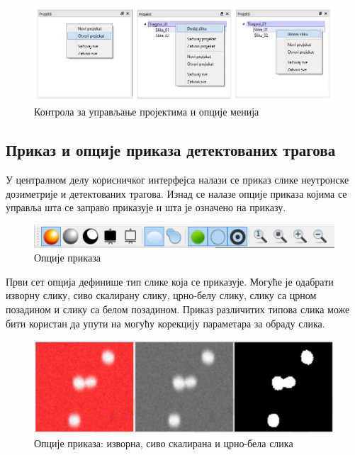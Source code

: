\documentclass[11pt,a4paper,serbian,oneside]{book}
\begin{document}
\begin{figure}[H]
\begin{center}
\includegraphics[width=150mm]{images/projects.png}
\end{center}
\caption{Контрола за управљање пројектима и опције менија}
\label{fig:projects}
\end{figure}

\subsection{Приказ и опције приказа детектованих трагова}

У централном делу корисничког интерфејса налази се приказ слике неутронске дозиметрије и де\-тек\-то\-ва\-них трагова. Изнад се налазе опције приказа којима се управља шта се заправо приказује и шта је означено на приказу.

\begin{figure}[H]
\begin{center}
\includegraphics[width=150mm]{images/viewoptions.png}
\end{center}
\caption{Опције приказа}
\label{fig:viewoptions}
\end{figure}

Први сет опција дефинише тип слике која се приказује. Могуће је одабрати изворну слику, сиво скалирану слику, црно-белу слику, слику са црном позадином и слику са белом позадином. Приказ различитих типова слика може бити користан да упути на могућу корекцију параметара за обраду слика.

\begin{figure}[H]
\begin{center}
\includegraphics[width=150mm]{images/imagetype.png}
\end{center}
\caption{Опције приказа: изворна, сиво скалирана и црно-бела слика}
\label{fig:imagetype}
\end{figure}
\end{document}
